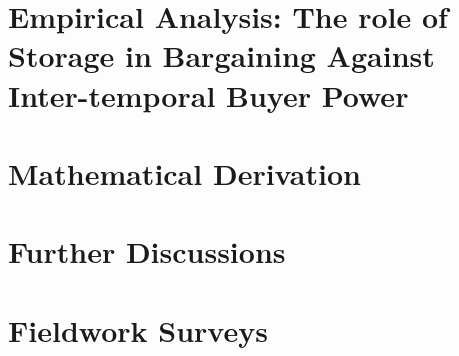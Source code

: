 \documentclass[12pt,authoryear, notitlepage]{elegantpaper}
\begin{document}
    


\newpage
\chapter{Empirical Analysis: The role of Storage in Bargaining Against Inter-temporal Buyer Power}

    



\newpage


\newpage
\appendix
\chapter{Mathematical Derivation}
    


\chapter{Further Discussions}
    
    


\chapter{Fieldwork Surveys}
    
\end{document}
